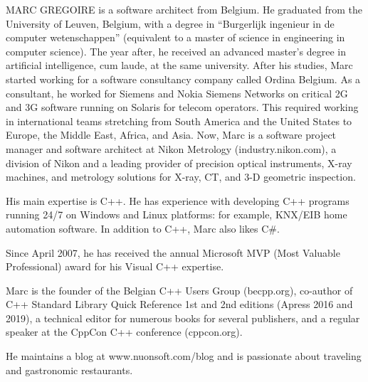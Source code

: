 MARC GREGOIRE is a software architect from Belgium. He graduated from the University of Leuven, Belgium, with a degree in “Burgerlijk ingenieur in de computer wetenschappen” (equivalent to a master of science in engineering in computer science). The year after, he received an advanced master’s degree in artificial intelligence, cum laude, at the same university. After his studies, Marc started working for a software consultancy company called Ordina Belgium. As a consultant, he worked for Siemens and Nokia Siemens Networks on critical 2G and 3G software running on Solaris for telecom operators. This required working in international teams stretching from South America and the United States to Europe, the Middle East, Africa, and Asia. Now, Marc is a software project manager and software architect at Nikon Metrology (industry.nikon.com), a division of Nikon and a leading provider of precision optical instruments, X-ray machines, and metrology solutions for X-ray, CT, and 3-D geometric inspection.

His main expertise is C++. He has experience with developing C++ programs running 24/7 on Windows and Linux platforms: for example, KNX/EIB home automation software. In addition to C++, Marc also likes C\#.

Since April 2007, he has received the annual Microsoft MVP (Most Valuable Professional) award for his Visual C++ expertise.

Marc is the founder of the Belgian C++ Users Group (becpp.org), co-author of C++ Standard Library Quick Reference 1st and 2nd editions (Apress 2016 and 2019), a technical editor for numerous books for several publishers, and a regular speaker at the CppCon C++ conference (cppcon.org).

He maintains a blog at www.nuonsoft.com/blog and is passionate about traveling and gastronomic restaurants.